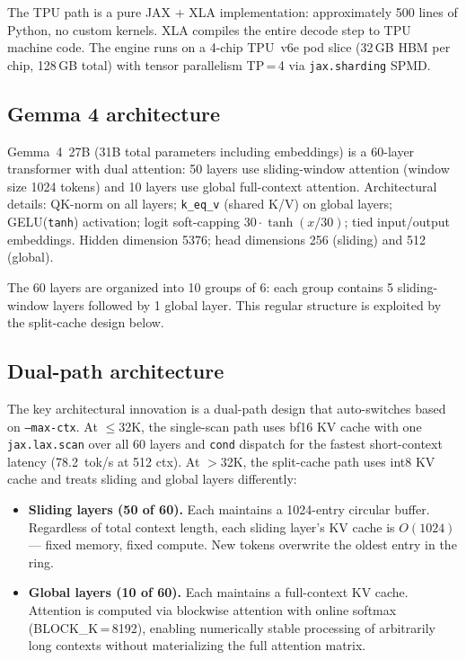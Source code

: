 The TPU path is a pure JAX + XLA implementation: approximately 500 lines
of Python, no custom kernels. XLA compiles the entire decode step to TPU
machine code. The engine runs on a 4-chip TPU~v6e pod slice (32\,GB HBM
per chip, 128\,GB total) with tensor parallelism TP\,=\,4 via
\texttt{jax.sharding} SPMD.

\subsection{Gemma 4 architecture}

Gemma~4~27B (31B total parameters including embeddings) is a 60-layer
transformer with dual attention: 50 layers use sliding-window attention
(window size 1024 tokens) and 10 layers use global full-context
attention. Architectural details: QK-norm on all layers;
\texttt{k\_eq\_v} (shared K/V) on global layers; GELU(\texttt{tanh})
activation; logit soft-capping $30 \cdot \tanh(x/30)$; tied input/output
embeddings. Hidden dimension 5376; head dimensions 256 (sliding) and
512 (global).

The 60 layers are organized into 10 groups of 6: each group contains
5 sliding-window layers followed by 1 global layer. This regular
structure is exploited by the split-cache design below.

\subsection{Dual-path architecture}

The key architectural innovation is a dual-path design that
auto-switches based on \texttt{--max-ctx}. At $\le$32K, the
single-scan path uses bf16 KV cache with one \texttt{jax.lax.scan}
over all 60 layers and \texttt{cond} dispatch for the fastest
short-context latency (78.2~tok/s at 512 ctx). At $>$32K, the
split-cache path uses int8 KV cache and treats sliding and global
layers differently:

\begin{itemize}
\item \textbf{Sliding layers (50 of 60).} Each maintains a 1024-entry
  circular buffer. Regardless of total context length, each sliding
  layer's KV cache is $O(1024)$ --- fixed memory, fixed compute. New
  tokens overwrite the oldest entry in the ring.

\item \textbf{Global layers (10 of 60).} Each maintains a full-context
  KV cache. Attention is computed via blockwise attention with online
  softmax (BLOCK\_K\,=\,8192), enabling numerically stable processing of
  arbitrarily long contexts without materializing the full attention
  matrix.
\end{itemize}

